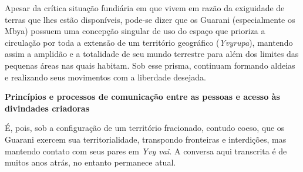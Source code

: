 Apesar da crítica situação fundiária em que vivem em razão da exiguidade
de terras que lhes estão disponíveis, pode-se dizer que os Guarani
(especialmente os Mbya) possuem uma concepção singular de uso do espaço
que prioriza a circulação por toda a extensão de um território
geográfico (\emph{Yvyrupa}), mantendo assim a amplidão e a totalidade de
seu mundo terrestre para além dos limites das pequenas áreas nas quais
habitam. Sob esse prisma, continuam formando aldeias e realizando seus
movimentos com a liberdade desejada.

\textbf{Princípios e processos de comunicação entre as pessoas e acesso
às divindades criadoras }

É, pois, sob a configuração de um território fracionado, contudo coeso,
que os Guarani exercem sua territorialidade, transpondo fronteiras e
interdições, mas mantendo contato com seus pares em \emph{Yvy vai.} A
conversa aqui transcrita é de muitos anos atrás, no entanto permanece
atual.

